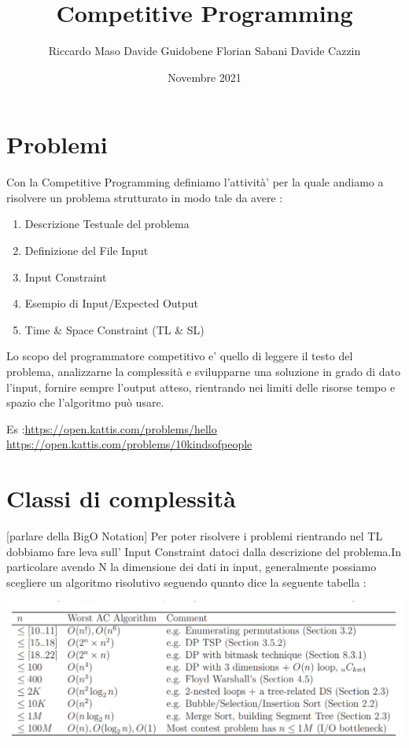 \documentclass{article}
\title{Competitive Programming}
\author{Riccardo Maso Davide Guidobene Florian Sabani Davide Cazzin}
\date{Novembre 2021}
\begin{document}
\maketitle

\section{Problemi}

Con la Competitive Programming definiamo l'attività' per la quale andiamo a risolvere un problema strutturato in modo tale da avere : 

\begin{enumerate}
    \item Descrizione Testuale del problema
    \item Definizione del File Input
    \item Input Constraint
    \item Esempio di Input/Expected Output 
    \item Time \& Space Constraint (TL \& SL)
\end{enumerate}

Lo scopo del programmatore competitivo e' quello di leggere il testo del problema, analizzarne la complessità e svilupparne una soluzione in grado di dato l'input, fornire sempre l'output atteso, rientrando nei limiti delle risorse tempo e spazio che l'algoritmo può usare.

Es :\url{https://open.kattis.com/problems/hello} \url{https://open.kattis.com/problems/10kindsofpeople}

\section{Classi di complessità}
[parlare della BigO Notation]\newline
Per poter risolvere i problemi rientrando nel TL dobbiamo fare leva sull' Input Constraint datoci dalla descrizione del problema.In particolare avendo N la dimensione dei dati in input, generalmente possiamo scegliere un algoritmo risolutivo seguendo quanto dice la seguente tabella : 

\includegraphics[scale=0.5]{matrix.PNG}
\end{document}
